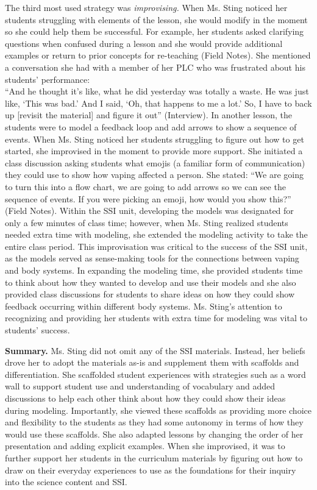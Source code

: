 \documentclass[11.5pt]{sig-alternate}
\begin{document}
\begin{large}
The third most used strategy was \textit{improvising.} When Ms. Sting noticed her students struggling with elements of the lesson, she would modify in the moment so she could help them be successful. For example, her students asked clarifying questions when confused during a lesson and she would provide additional examples or return to prior concepts for re-teaching (Field Notes). She mentioned a conversation she had with a member of her PLC who was frustrated about his students’ performance: \\“And he thought it’s like, what he did yesterday was totally a waste. He was just like, ‘This was bad.’ And I said, ‘Oh, that happens to me a lot.’ So, I have to back up [revisit the material] and figure it out” (Interview). In another lesson, the students were to model a feedback loop and add arrows to show a sequence of events. When Ms. Sting noticed her students struggling to figure out how to get started, she improvised in the moment to provide more support. She initiated a class discussion asking students what emojis (a familiar form of communication) they could use to show how vaping affected a person. She stated: “We are going to turn this into a flow chart, we are going to add arrows so we can see the sequence of events. If you were picking an emoji, how would you show this?” (Field Notes). Within the SSI unit, developing the models was designated for only a few minutes of class time; however, when Ms. Sting realized students needed extra time with modeling, she extended the modeling activity to take the entire class period. This improvisation was critical to the success of the SSI unit, as the models served as sense-making tools for the connections between vaping and body systems. In expanding the modeling time, she provided students time to think about how they wanted to develop and use their models and she also provided class discussions for students to share ideas on how they could show feedback occurring within different body systems. Ms. Sting’s attention to recognizing and providing her students with extra time for modeling was vital to students’ success.

\textbf{Summary.} Ms. Sting did not omit any of the SSI materials. Instead, her beliefs drove her to adopt the materials as-is and supplement them with scaffolds and differentiation. She scaffolded student experiences with strategies such as a word wall to support student use and understanding of vocabulary and added discussions to help each other think about how they could show their ideas during modeling. Importantly, she viewed these scaffolds as providing more choice and flexibility to the students as they had some autonomy in terms of how they would use these scaffolds. She also adapted lessons by changing the order of her presentation and adding explicit examples. When she improvised, it was to further support her students in the curriculum materials by figuring out how to draw on their everyday experiences to use as the foundations for their inquiry into the science content and SSI.


\end{large}
\end{document}
